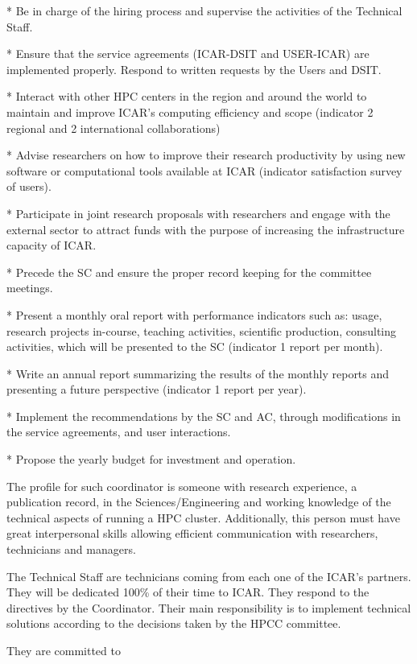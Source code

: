 \documentclass{article}
\begin{document}
* Be in charge of the hiring process and supervise the activities of the Technical Staff.

* Ensure that the service agreements (ICAR-DSIT and USER-ICAR) are implemented properly. Respond to written requests by the Users and DSIT.

* Interact with other HPC centers in the region and around the world to maintain and improve ICAR’s computing efficiency and scope (indicator 2 regional and 2 international collaborations)

* Advise researchers on how to improve their research productivity by using new software or computational tools available at ICAR (indicator satisfaction survey of users).

* Participate in joint research proposals with researchers and engage with the external sector to attract funds with the purpose of increasing the infrastructure capacity of ICAR.

* Precede the SC and ensure the proper record keeping for the committee meetings.

* Present a monthly oral report with performance indicators such as: usage, research projects in-course, teaching activities, scientific production, consulting activities, which will be presented to the SC (indicator 1 report per month).

* Write an annual report summarizing the results of the monthly reports and presenting a future perspective (indicator 1 report per year).

* Implement the recommendations by the SC and AC, through modifications in the service agreements, and user interactions.

* Propose the yearly budget for investment and operation.

The profile for such coordinator is someone with research experience, a publication record, in the Sciences/Engineering and working knowledge of the technical aspects of running a HPC cluster. Additionally, this person must have great interpersonal skills allowing efficient communication with researchers, technicians and managers.

The Technical Staff are technicians coming from each one of the ICAR’s partners. They will be dedicated 100\% of their time to ICAR. They respond to the directives by the Coordinator. Their main responsibility is to implement technical solutions according to the decisions taken by the HPCC committee.

They are committed to
\end{document}
